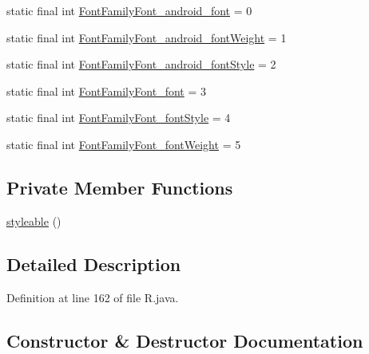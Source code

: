 \begin{DoxyCompactItemize}
\item 
static final int \mbox{\hyperlink{classandroid_1_1support_1_1mediacompat_1_1_r_1_1styleable_a18db46ad6b11ca5252162fba32d8ed02}{Font\+Family\+Font\+\_\+android\+\_\+font}} = 0
\item 
static final int \mbox{\hyperlink{classandroid_1_1support_1_1mediacompat_1_1_r_1_1styleable_ad947c296c3c6ca863276ba068d086e4f}{Font\+Family\+Font\+\_\+android\+\_\+font\+Weight}} = 1
\item 
static final int \mbox{\hyperlink{classandroid_1_1support_1_1mediacompat_1_1_r_1_1styleable_a41a27fef975ce0b13e3fe62520745321}{Font\+Family\+Font\+\_\+android\+\_\+font\+Style}} = 2
\item 
static final int \mbox{\hyperlink{classandroid_1_1support_1_1mediacompat_1_1_r_1_1styleable_a6023dc6f9508d9725f106efd6e2f91f0}{Font\+Family\+Font\+\_\+font}} = 3
\item 
static final int \mbox{\hyperlink{classandroid_1_1support_1_1mediacompat_1_1_r_1_1styleable_aba1bc730695a4e66ef6cb7945eb8ea1b}{Font\+Family\+Font\+\_\+font\+Style}} = 4
\item 
static final int \mbox{\hyperlink{classandroid_1_1support_1_1mediacompat_1_1_r_1_1styleable_a3e4dffd2fc80e148b73a70308ab7c0a7}{Font\+Family\+Font\+\_\+font\+Weight}} = 5
\end{DoxyCompactItemize}
\subsection*{Private Member Functions}
\begin{DoxyCompactItemize}
\item 
\mbox{\hyperlink{classandroid_1_1support_1_1mediacompat_1_1_r_1_1styleable_aafc84d4f6d9e34eb5b057fe0177d99c9}{styleable}} ()
\end{DoxyCompactItemize}


\subsection{Detailed Description}


Definition at line 162 of file R.\+java.



\subsection{Constructor \& Destructor Documentation}
\mbox{\label{classandroid_1_1support_1_1mediacompat_1_1_r_1_1styleable_aafc84d4f6d9e34eb5b057fe0177d99c9}} 
